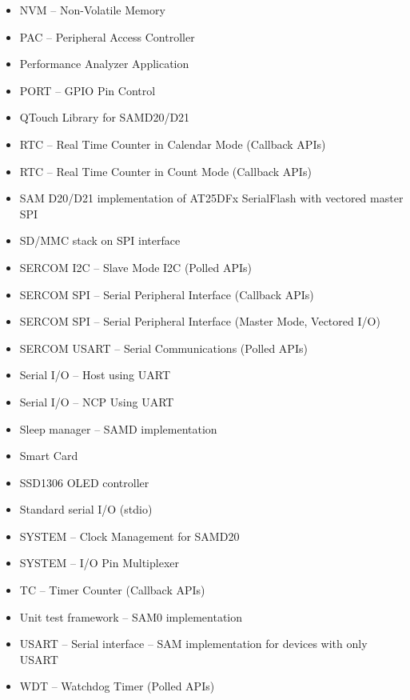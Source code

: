 \begin{multicols}{2}
\begin{flushleft}
\begin{itemize}
	\item NVM -- Non-Volatile Memory
	\item PAC -- Peripheral Access Controller
	\item Performance Analyzer Application
	\item PORT -- GPIO Pin Control
	\item QTouch Library for SAMD20/D21
	\item RTC -- Real Time Counter in Calendar Mode (Callback APIs)
	\item RTC -- Real Time Counter in Count Mode (Callback APIs)
	\item SAM D20/D21 implementation of AT25DFx SerialFlash with vectored master SPI
	\item SD/MMC stack on SPI interface
	\item SERCOM I2C -- Slave Mode I2C (Polled APIs)
	\item SERCOM SPI -- Serial Peripheral Interface (Callback APIs)
	\item SERCOM SPI -- Serial Peripheral Interface (Master Mode, Vectored I/O)
	\item SERCOM USART -- Serial Communications (Polled APIs)
	\item Serial I/O -- Host using UART
	\item Serial I/O -- NCP Using UART
	\item Sleep manager -- SAMD implementation
	\item Smart Card
	\item SSD1306 OLED controller
	\item Standard serial I/O (stdio)
	\item SYSTEM -- Clock Management for SAMD20
	\item SYSTEM -- I/O Pin Multiplexer
	\item TC -- Timer Counter (Callback APIs)
	\item Unit test framework -- SAM0 implementation
	\item USART -- Serial interface -- SAM implementation for devices with only USART
	\item WDT -- Watchdog Timer (Polled APIs)
\end{itemize}
\end{flushleft}
\end{multicols}

